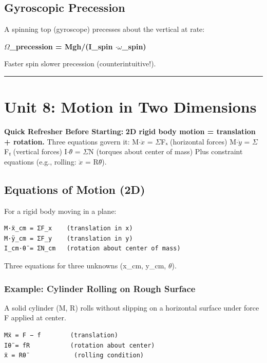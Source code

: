 \documentclass[12pt,a4paper,openany]{book}
\begin{document}
{{\subsection{Gyroscopic Precession}

A spinning top (gyroscope) precesses about the vertical at rate:

\textbf{$\Omega$_precession = Mgh/(I_spin $\cdot\omega$_spin)}

Faster spin  slower precession (counterintuitive!).

\bigskip\noindent\rule{\textwidth}{0.4pt}\bigskip

\section{Unit 8: Motion in Two Dimensions}

\begin{prereqbox}
 \textbf{Quick Refresher Before Starting:}
\textbf{2D rigid body motion = translation + rotation.} Three equations govern it:
M$\cdot\ddot{x}$ = $\Sigma$Fₓ (horizontal forces)
M$\cdot\ddot{y}$ = $\Sigma$Fᵧ (vertical forces)
I$\cdot\theta$̈ = $\Sigma$N (torques about center of mass)
Plus constraint equations (e.g., rolling: $\ddot{x}$ = R$\theta$̈).
\end{prereqbox}


\subsection{Equations of Motion (2D) }

For a rigid body moving in a plane:

\begin{verbatim}
M·ẍ_cm = ΣF_x    (translation in x)
M·ÿ_cm = ΣF_y    (translation in y)
I_cm·θ̈ = ΣN_cm   (rotation about center of mass)
\end{verbatim}

Three equations for three unknowns (x_cm, y_cm, $\theta$).

\subsubsection{Example: Cylinder Rolling on Rough Surface}
A solid cylinder (M, R) rolls without slipping on a horizontal surface under force F applied at center.

\begin{verbatim}
Mẍ = F − f        (translation)
Iθ̈ = fR           (rotation about center)
ẍ = Rθ̈             (rolling condition)


\end{verbatim}}}
\end{document}
